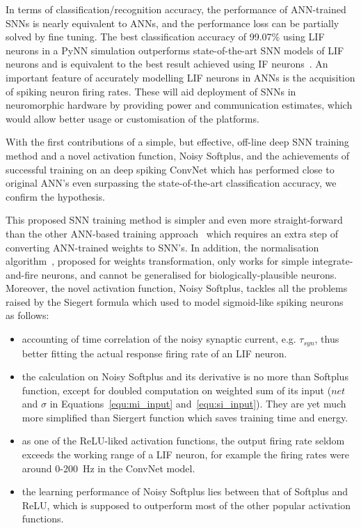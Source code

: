 In terms of classification/recognition accuracy, the performance of ANN-trained SNNs is nearly equivalent to ANNs, and the performance loss can be partially solved by fine tuning.
The best classification accuracy of 99.07\% using LIF neurons in a PyNN simulation outperforms state-of-the-art SNN models of LIF neurons and is equivalent to the best result achieved using IF neurons~\cite{diehl2015fast}.
An important feature of accurately modelling LIF neurons in ANNs is the acquisition of spiking neuron firing rates. These will aid deployment of SNNs in neuromorphic hardware by providing power and communication estimates, which would allow better usage or customisation of the platforms.

With the first contributions of a simple, but effective, off-line deep SNN training method and a novel activation function, Noisy Softplus, and the achievements of successful training on an deep spiking ConvNet which has performed close to original ANN's even surpassing the state-of-the-art classification accuracy, we confirm the hypothesis. 

This proposed SNN training method is simpler and even more straight-forward than the other ANN-based training approach~\cite{cao2015spiking,diehl2015fast} which requires an extra step of converting ANN-trained weights to SNN's.
In addition, the normalisation algorithm~\cite{diehl2015fast}, proposed for weights transformation, only works for simple integrate-and-fire neurons, and cannot be generalised for biologically-plausible neurons.
Moreover, the novel activation function, Noisy Softplus, tackles all the problems raised by the Siegert formula which used to model sigmoid-like spiking neurons~\cite{Jug_etal_2012} as follows: 
	\begin{itemize}
		\item accounting of time correlation of the noisy synaptic current, e.g. $\tau_{syn}$, thus better fitting the actual response firing rate of an LIF neuron. %
		
		
		\item the calculation on Noisy Softplus and its derivative is no more than Softplus function, except for doubled computation on weighted sum of its input ($net$ and $\sigma$ in Equations~\ref{equ:mi_input} and~\ref{equ:si_input}).
		They are yet much more simplified than Siergert function which saves training time and energy.
		
		\item as one of the ReLU-liked activation functions, the output firing rate seldom exceeds the working range of a LIF neuron, for example the firing rates were around 0-200~Hz in the ConvNet model.
		
		\item the learning performance of Noisy Softplus lies between that of Softplus and ReLU, which is supposed to outperform most of the other popular activation functions.
	\end{itemize}

